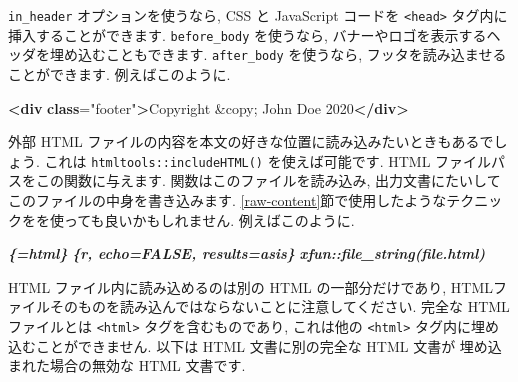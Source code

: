 \documentclass[
  11pt,
  lualatex,ja=standard,jafont=noto]{bxjsreport}
\newenvironment{Shaded}{\begin{snugshade}}{\end{snugshade}}
\newcommand{\DecValTok}[1]{\textcolor[rgb]{0.00,0.00,0.81}{#1}}
\newcommand{\ErrorTok}[1]{\textcolor[rgb]{0.64,0.00,0.00}{\textbf{#1}}}
\newcommand{\InformationTok}[1]{\textcolor[rgb]{0.56,0.35,0.01}{\textbf{\textit{#1}}}}
\newcommand{\KeywordTok}[1]{\textcolor[rgb]{0.13,0.29,0.53}{\textbf{#1}}}
\newcommand{\NormalTok}[1]{#1}
\newcommand{\OtherTok}[1]{\textcolor[rgb]{0.56,0.35,0.01}{#1}}
\newcommand{\StringTok}[1]{\textcolor[rgb]{0.31,0.60,0.02}{#1}}
\begin{document}
\texttt{in\_header} オプションを使うなら, CSS と JavaScript コードを \texttt{\textless{}head\textgreater{}} タグ内に挿入することができます. \texttt{before\_body} を使うなら, バナーやロゴを表示するヘッダを埋め込むこともできます. \texttt{after\_body} を使うなら, フッタを読み込ませることができます. 例えばこのように.

\begin{Shaded}
\begin{Highlighting}[]
\KeywordTok{\textless{}div} \ErrorTok{class}\OtherTok{=}\StringTok{"footer"}\KeywordTok{\textgreater{}}\NormalTok{Copyright }\DecValTok{\&copy;}\NormalTok{ John Doe 2020}\KeywordTok{\textless{}/div\textgreater{}}
\end{Highlighting}
\end{Shaded}

外部 HTML ファイルの内容を本文の好きな位置に読み込みたいときもあるでしょう. これは \texttt{htmltools::includeHTML()} を使えば可能です. HTML ファイルパスをこの関数に与えます. 関数はこのファイルを読み込み, 出力文書にたいしてこのファイルの中身を書き込みます. \ref{raw-content}節で使用したようなテクニックをを使っても良いかもしれません. 例えばこのように.

\begin{Shaded}
\begin{Highlighting}[]
\InformationTok{\textasciigrave{}\textasciigrave{}\textasciigrave{}\textasciigrave{}\{=html\}}
\InformationTok{\textasciigrave{}\textasciigrave{}\textasciigrave{}\{r, echo=FALSE, results=\textquotesingle{}asis\textquotesingle{}\}}
\InformationTok{xfun::file\_string(\textquotesingle{}file.html\textquotesingle{})}
\InformationTok{\textasciigrave{}\textasciigrave{}\textasciigrave{}}
\InformationTok{\textasciigrave{}\textasciigrave{}\textasciigrave{}\textasciigrave{}}
\end{Highlighting}
\end{Shaded}

HTML ファイル内に読み込めるのは別の HTML の一部分だけであり, HTMLファイルそのものを読み込んではならないことに注意してください. 完全な HTML ファイルとは \texttt{\textless{}html\textgreater{}} タグを含むものであり, これは他の \texttt{\textless{}html\textgreater{}} タグ内に埋め込むことができません. 以下は HTML 文書に別の完全な HTML 文書が 埋め込まれた場合の無効な HTML 文書です.
\end{document}
